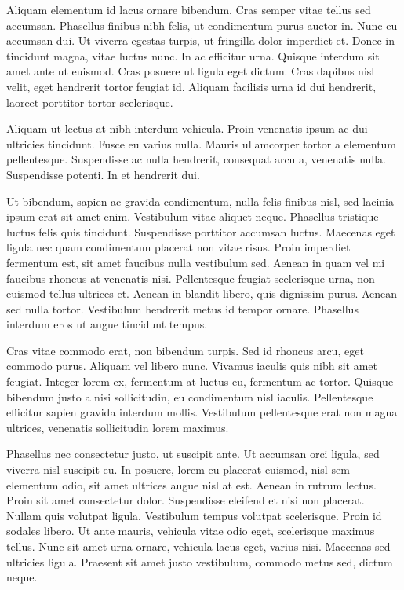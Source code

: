\documentclass[11pt]{article}
\begin{document}
    Aliquam elementum id lacus ornare bibendum. Cras semper vitae tellus sed accumsan. Phasellus finibus nibh felis, ut condimentum purus auctor in. Nunc eu accumsan dui. Ut viverra egestas turpis, ut fringilla dolor imperdiet et. Donec in tincidunt magna, vitae luctus nunc. In ac efficitur urna. Quisque interdum sit amet ante ut euismod. Cras posuere ut ligula eget dictum. Cras dapibus nisl velit, eget hendrerit tortor feugiat id. Aliquam facilisis urna id dui hendrerit, laoreet porttitor tortor scelerisque.

    Aliquam ut lectus at nibh interdum vehicula. Proin venenatis ipsum ac dui ultricies tincidunt. Fusce eu varius nulla. Mauris ullamcorper tortor a elementum pellentesque. Suspendisse ac nulla hendrerit, consequat arcu a, venenatis nulla. Suspendisse potenti. In et hendrerit dui.

    Ut bibendum, sapien ac gravida condimentum, nulla felis finibus nisl, sed lacinia ipsum erat sit amet enim. Vestibulum vitae aliquet neque. Phasellus tristique luctus felis quis tincidunt. Suspendisse porttitor accumsan luctus. Maecenas eget ligula nec quam condimentum placerat non vitae risus. Proin imperdiet fermentum est, sit amet faucibus nulla vestibulum sed. Aenean in quam vel mi faucibus rhoncus at venenatis nisi. Pellentesque feugiat scelerisque urna, non euismod tellus ultrices et. Aenean in blandit libero, quis dignissim purus. Aenean sed nulla tortor. Vestibulum hendrerit metus id tempor ornare. Phasellus interdum eros ut augue tincidunt tempus.

    Cras vitae commodo erat, non bibendum turpis. Sed id rhoncus arcu, eget commodo purus. Aliquam vel libero nunc. Vivamus iaculis quis nibh sit amet feugiat. Integer lorem ex, fermentum at luctus eu, fermentum ac tortor. Quisque bibendum justo a nisi sollicitudin, eu condimentum nisl iaculis. Pellentesque efficitur sapien gravida interdum mollis. Vestibulum pellentesque erat non magna ultrices, venenatis sollicitudin lorem maximus.

    Phasellus nec consectetur justo, ut suscipit ante. Ut accumsan orci ligula, sed viverra nisl suscipit eu. In posuere, lorem eu placerat euismod, nisl sem elementum odio, sit amet ultrices augue nisl at est. Aenean in rutrum lectus. Proin sit amet consectetur dolor. Suspendisse eleifend et nisi non placerat. Nullam quis volutpat ligula. Vestibulum tempus volutpat scelerisque. Proin id sodales libero. Ut ante mauris, vehicula vitae odio eget, scelerisque maximus tellus. Nunc sit amet urna ornare, vehicula lacus eget, varius nisi. Maecenas sed ultricies ligula. Praesent sit amet justo vestibulum, commodo metus sed, dictum neque.
\end{document}

